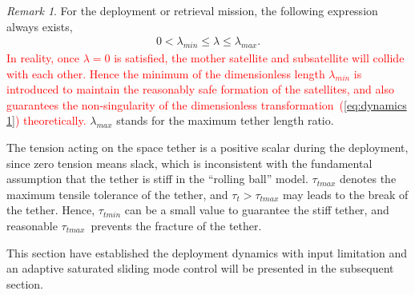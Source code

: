 \documentclass[3p]{elsarticle}
\theoremstyle{plain}
\theoremstyle{remark}
\newtheorem{myrem}{Remark}
\begin{document}
\begin{myrem}

For the deployment or retrieval mission, the following expression always exists,
\begin{align}
0<\lambda_{min}\le\lambda\le \lambda_{max}\label{eq:lambda}.
\end{align}
\textcolor{red}{In reality, once $\lambda = 0$ is satisfied, the mother satellite and subsatellite will collide with each other. Hence the minimum of the dimensionless length $\lambda_{min}$ is introduced to maintain the reasonably safe formation of the satellites, and also guarantees the non-singularity of the dimensionless transformation~(\ref{eq:dynamics 1}) theoretically.} $\lambda_{max}$ stands for the maximum tether length ratio.\par
The tension acting on the space tether is a positive scalar during the deployment, since zero tension means slack, which is inconsistent with the fundamental assumption that the tether is stiff in the ``rolling ball'' model. $\tau_{tmax}$ denotes the maximum tensile tolerance of the tether, and $\tau_t>\tau_{tmax}$ may leads to the break of the tether. Hence, $\tau_{tmin}$ can be a small value to guarantee the stiff tether, and reasonable $\tau_{tmax}$\ prevents the fracture of the tether.
\end{myrem}
This section have established the deployment dynamics with input limitation and an adaptive saturated sliding mode  control will be presented in the subsequent section.
\end{document}

